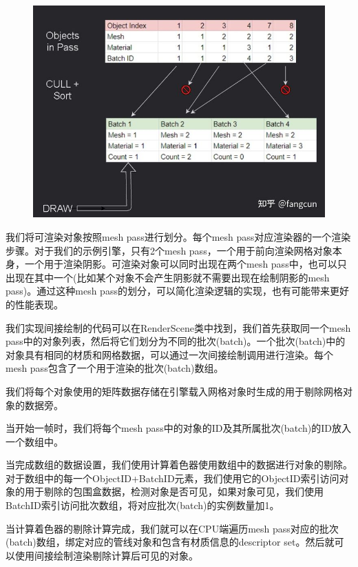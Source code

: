 \documentclass{ctexart}
\begin{document}
\begin{figure}[H]
	\centering
	\includegraphics[scale=0.4]{img/1-4.jpg}
\end{figure}

我们将可渲染对象按照mesh pass进行划分。每个mesh pass对应渲染器的一个渲染步骤。对于我们的示例引擎，只有2个mesh pass，一个用于前向渲染网格对象本身，一个用于渲染阴影。可渲染对象可以同时出现在两个mesh pass中，也可以只出现在其中一个(比如某个对象不会产生阴影就不需要出现在绘制阴影的mesh pass)。通过这种mesh pass的划分，可以简化渲染逻辑的实现，也有可能带来更好的性能表现。

我们实现间接绘制的代码可以在RenderScene类中找到，我们首先获取同一个mesh pass中的对象列表，然后将它们划分为不同的批次(batch)。一个批次(batch)中的对象具有相同的材质和网格数据，可以通过一次间接绘制调用进行渲染。每个mesh pass包含了一个用于渲染的批次(batch)数组。

我们将每个对象使用的矩阵数据存储在引擎载入网格对象时生成的用于剔除网格对象的数据旁。

当开始一帧时，我们将每个mesh pass中的对象的ID及其所属批次(batch)的ID放入一个数组中。

当完成数组的数据设置，我们使用计算着色器使用数组中的数据进行对象的剔除。对于数组中的每一个ObjectID+BatchID元素，我们使用它的ObjectID索引访问对象的用于剔除的包围盒数据，检测对象是否可见，如果对象可见，我们使用BatchID索引访问批次数组，将对应批次(batch)的实例数量加1。

当计算着色器的剔除计算完成，我们就可以在CPU端遍历mesh pass对应的批次(batch)数组，绑定对应的管线对象和包含有材质信息的descriptor set。然后就可以使用间接绘制渲染剔除计算后可见的对象。

\newpage
\end{document}
